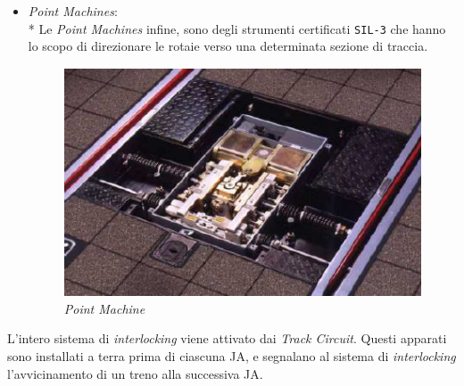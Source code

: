 \begin{itemize}
\begin{figure}[h]
		\end{figure}
		\item \emph{Point Machines}:\\*
		Le \emph{Point Machines} infine, sono degli strumenti certificati \texttt{SIL-3} che hanno lo scopo di direzionare le rotaie verso una determinata sezione di traccia.
		\begin{figure}[h]
				\centering
				\includegraphics[width=0.7\linewidth]{img/pointmachine}
				\caption{\emph{Point Machine}}
				\label{fig:pointmachine}
			\end{figure}
	\end{itemize}
L'intero sistema di \emph{interlocking} viene attivato dai \emph{Track Circuit}. Questi apparati sono installati a terra prima di ciascuna JA, e segnalano al sistema di \emph{interlocking} l'avvicinamento di un treno alla successiva JA.
